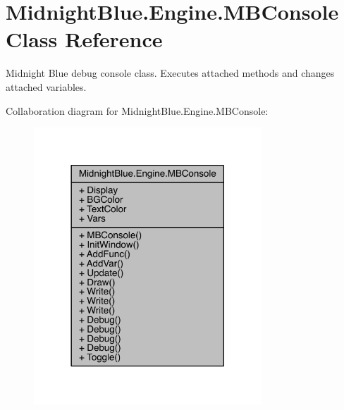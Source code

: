\hypertarget{class_midnight_blue_1_1_engine_1_1_m_b_console}{}\section{Midnight\+Blue.\+Engine.\+M\+B\+Console Class Reference}
\label{class_midnight_blue_1_1_engine_1_1_m_b_console}


Midnight Blue debug console class. Executes attached methods and changes attached variables.  




Collaboration diagram for Midnight\+Blue.\+Engine.\+M\+B\+Console\+:
\nopagebreak
\begin{figure}[H]
\begin{center}
\leavevmode
\includegraphics[width=242pt]{class_midnight_blue_1_1_engine_1_1_m_b_console__coll__graph}
\end{center}
\end{figure}
